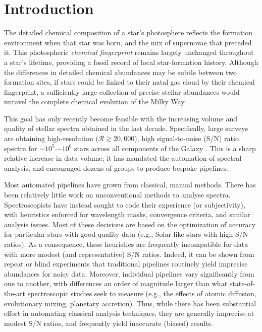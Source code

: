 \documentclass[12pt,preprint]{aastex}
\begin{document}
\section{Introduction}
The detailed chemical composition of a star's photosphere reflects 
the formation environment when that star was born, and the mix of supernovae that 
preceded it.  This photospheric \emph{chemical fingerprint} remains largely
unchanged throughout a star's lifetime, providing a fossil record of 
local star-formation history.  Although the differences in detailed chemical
abundances may be subtle between two formation sites, if stars could be linked
to their natal gas cloud by their chemical fingerprint, a sufficiently large
collection of precise stellar abundances would unravel the
complete chemical evolution of the Milky Way. 


This goal has only recently become feasible with the increasing volume and 
quality of stellar spectra obtained in the last decade.  Specifically, large 
surveys are obtaining high-resolution ($\mathcal{R} \gtrsim 20,000$), high 
signal-to-noise (S/N) ratio spectra for $\sim10^5$---$10^6$ stars across all 
components of the Galaxy \citep{Gilmore_2012,Zasowski_2013,De_Silva_2015}.  This is a sharp relative increase in data volume; it has mandated the automation of spectral analysis, and encouraged dozens of
groups to produce bespoke pipelines.



Most automated pipelines have grown from classical, manual methods.  There has 
been relatively little work on unconventional methods to analyse spectra.  
Spectroscopists have instead sought to code their experience (or subjectivity), 
with heuristics enforced for wavelength masks, convergence criteria, 
and similar analysis issues.  Most of these decisions are based on the optimization of accuracy for particular stars with good quality data (e.g., Solar-like
stars with high S/N ratios).  As a consequence, these heuristics are frequently 
incompatible for data with more modest (and representative) S/N ratios.  Indeed, 
it can be shown from repeat or blind experiments that traditional pipelines 
routinely yield imprecise abundances for noisy data.  Moreover, individual 
pipelines vary significantly from one to another, with differences an order of 
magnitude larger than what state-of-the-art spectroscopic studies seek to 
measure (e.g., the effects of atomic diffusion, evolutionary mixing, planetary
accretion).  Thus, while there has been substantial effort in automating 
classical analysis techniques, they are generally imprecise at modest S/N 
ratios, and frequently yield inaccurate (biased) results.
\end{document}
